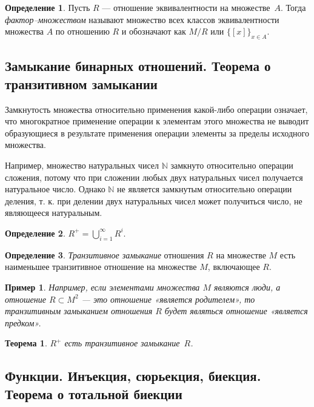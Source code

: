 \documentclass{article}
\newtheorem*{theorem*}{Теорема}
\theoremstyle{plain}
\newtheorem*{example*}{Пример}
\theoremstyle{definition}
\newtheorem{definition}{Определение}[subsection]
\begin{document}
\begin{definition}
	Пусть \(R\) — отношение эквивалентности на множестве~\(A\). Тогда \textit{фактор–множеством} называют множество всех классов эквивалентности множества \(A\) по отношению \(R\) и обозначают как \(M / R\) или \(\{ [x] \}_{x \in A}\).
\end{definition}

\subsection{Замыкание бинарных отношений. Теорема о транзитивном замыкании}

Замкнутость множества относительно применения какой-либо операции означает, что многократное применение операции к элементам этого множества не выводит образующиеся в результате применения операции элементы за пределы исходного множества.

Например, множество натуральных чисел \(\mathbb{N}\) замкнуто относительно операции сложения, потому что при сложении любых двух натуральных чисел получается натуральное число. Однако \(\mathbb{N}\) не является замкнутым относительно операции деления, т. к. при делении двух натуральных чисел может получиться число, не являющееся натуральным.

\begin{definition}
	\(R^+ = \bigcup \limits ^{{\infty}} _{{i = 1}}R^{i}.\)
\end{definition}

\begin{definition}
	\textit{Транзитивное замыкание} отношения \(R\) на множестве \(M\) есть наименьшее транзитивное отношение на множестве \(M\), включающее \(R\).
\end{definition}

\begin{example*}
	Например, если элементами множества \(M\) являются люди, а отношение \(R \subset M^2\) — это отношение «является родителем», то транзитивным замыканием отношения \(R\) будет являться отношение «является предком».
\end{example*}

\begin{theorem*}
	\(R^+\) есть транзитивное замыкание~\(R\).
\end{theorem*}

\subsection{Функции. Инъекция, сюрьекция, биекция. Теорема о тотальной биекции}
\end{document}
